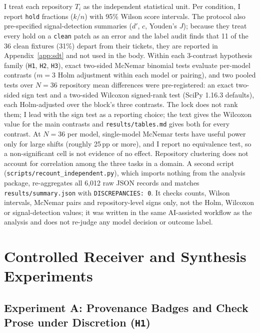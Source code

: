 \documentclass[11pt]{article}
\begin{document}
I treat each repository \(T_i\) as the independent statistical unit. Per condition, I report \texttt{hold} fractions (\(k/n\)) with 95\% Wilson score intervals. The protocol also pre-specified signal-detection summaries (\(d'\), \(c\), Youden's \(J\)); because they treat every hold on a \texttt{clean} patch as an error and the label audit finds that 11 of the 36 clean fixtures (31\%) depart from their tickets, they are reported in Appendix~\ref{app:sdt} and not used in the body. Within each 3-contrast hypothesis family (\texttt{H1}, \texttt{H2}, \texttt{H3}), exact two-sided McNemar binomial tests evaluate per-model contrasts (\(m = 3\) Holm adjustment within each model or pairing), and two pooled tests over \(N = 36\) repository mean differences were pre-registered: an exact two-sided sign test and a two-sided Wilcoxon signed-rank test (SciPy 1.16.3 defaults), each Holm-adjusted over the block's three contrasts. The lock does not rank them; I lead with the sign test as a reporting choice; the text gives the Wilcoxon value for the main contrasts and \texttt{results/tables.md} gives both for every contrast. At \(N = 36\) per model, single-model McNemar tests have useful power only for large shifts (roughly 25\,pp or more), and I report no equivalence test, so a non-significant cell is not evidence of no effect. Repository clustering does not account for correlation among the three tasks in a domain. A second script (\texttt{scripts/recount\_independent.py}), which imports nothing from the analysis package, re-aggregates all 6,012 raw JSON records and matches \texttt{results/summary.json} with \texttt{DISCREPANCIES: 0}. It checks counts, Wilson intervals, McNemar pairs and repository-level signs only, not the Holm, Wilcoxon or signal-detection values; it was written in the same AI-assisted workflow as the analysis and does not re-judge any model decision or outcome label.

\section{Controlled Receiver and Synthesis Experiments}
\label{sec:exp_abc}

\subsection{Experiment A: Provenance Badges and Check Prose under Discretion (\texttt{H1})}
\end{document}
